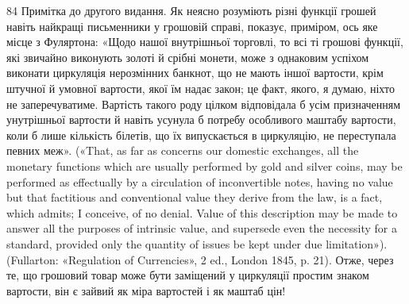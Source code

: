 84 Примітка до другого видання. Як неясно розуміють різні функції
грошей навіть найкращі письменники у грошовій справі, показує, приміром,
ось яке місце з Фуляртона: «Щодо нашої внутрішньої торговлі, то
всі ті грошові функції, які звичайно виконують золоті й срібні монети,
може з однаковим успіхом виконати циркуляція нерозмінних банкнот,
що не мають іншої вартости, крім штучної й умовної вартости, якої їм
надає закон; це факт, якого, я думаю, ніхто не заперечуватиме. Вартість
такого роду цілком відповідала б усім призначенням унутрішньої вартости
й навіть усунула б потребу особливого маштабу вартости, коли б лише
кількість білетів, що їх випускається в циркуляцію, не переступала
певних меж». («That, as far as concerns our domestic exchanges, all the
monetary functions which are usually performed by gold and silver coins,
may be performed as effectually by a circulation of inconvertible notes,
having no value but that factitious and conventional value they derive
from the law, is a fact, which admits; I conceive, of no denial. Value of
this description may be made to answer all the purposes of intrinsic value,
and supersede even the necessity for a standard, provided only the quantity
of issues be kept under due limitation»). (Fullarton: «Regulation of
Currencies», 2 ed., London 1845, p. 21). Отже, через те, що грошовий
товар може бути заміщений у циркуляції простим знаком вартости, він
є зайвий як міра вартостей і як маштаб цін!
